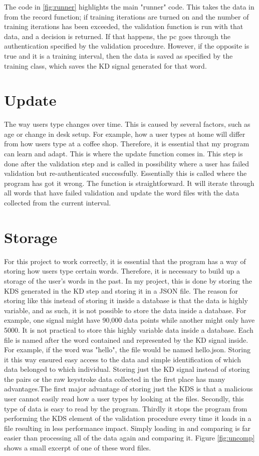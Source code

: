 \documentclass[10pt,a4paper]{report}
\begin{document}
The code in \ref{fig:runner} highlights the main "runner" code. This takes the data in from the record function; if training iterations are turned on and the number of training iterations has been exceeded, the validation function is run with that data, and a decision is returned. If that happens, the pc goes through the authentication specified by the validation procedure. However, if the opposite is true and it is a training interval, then the data is saved as specified by the training class, which saves the KD signal generated for that word.

\section{Update}
\label{sssec:update}

The way users type changes over time. This is caused by several factors, such as age or change in desk setup. For example, how a user types at home will differ from how users type at a coffee shop. Therefore, it is essential that my program can learn and adapt. This is where the update function comes in. This step is done after the validation step and is called in possibility where a user has failed validation but re-authenticated successfully. Essentially this is called where the program has got it wrong. 
The function is straightforward. It will iterate through all words that have failed validation and update the word files with the data collected from the current interval.

\section{Storage}
\label{sssec:Storage}
For this project to work correctly, it is essential that the program has a way of storing how users type certain words. Therefore, it is necessary to build up a storage of the user’s words in the past. In my project, this is done by storing the KDS generated in the KD step and storing it in a JSON file. The reason for storing like this instead of storing it inside a database is that the data is highly variable, and as such, it is not possible to store the data inside a database. For example, one signal might have 90,000 data points while another might only have 5000. It is not practical to store this highly variable data inside a database. Each file is named after the word contained and represented by the KD signal inside. For example, if the word was "hello", the file would be named hello.json. Storing it this way ensured easy access to the data and simple identification of which data belonged to which individual. Storing just the KD signal instead of storing the pairs or the raw keystroke data collected in the first place has many advantages.The first major advantage of storing just the KDS is that a malicious user cannot easily read how a user types by looking at the files. Secondly, this type of data is easy to read by the program. Thirdly it stops the program from performing the KDS element of the validation procedure every time it loads in a file resulting in less performance impact. Simply loading in and comparing is far easier than processing all of the data again and comparing it. Figure \ref{fig:uncomp} shows a small excerpt of one of these word files.
\end{document}
